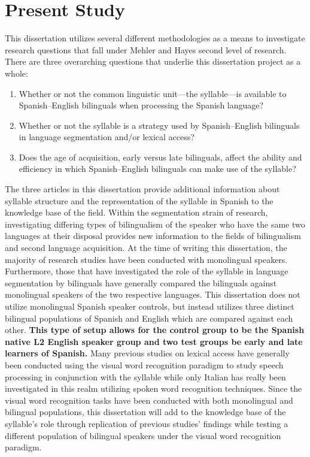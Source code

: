 
\section{Present Study}

This dissertation utilizes several different methodologies as a means to investigate research questions that fall under Mehler and Hayes \parencite*{Mehler1981-wp} second level of research. There are three overarching questions that underlie this dissertation project as a whole:
\begin{enumerate}
\item Whether or not the common linguistic unit—the syllable—is available to Spanish–English bilinguals when processing the Spanish language?
\item Whether or not the syllable is a strategy used by Spanish–English bilinguals in language segmentation and/or lexical access?
\item Does the age of acquisition, early versus late bilinguals, affect the ability and efficiency in which Spanish–English bilinguals can make use of the syllable?
\end{enumerate}

The three articles in this dissertation provide additional information about syllable structure and the representation of the syllable in Spanish to the knowledge base of the field. Within the segmentation strain of research, investigating differing types of bilingualism of the speaker who have the same two languages at their disposal provides new information to the fields of bilingualism and second language acquisition. At the time of writing this dissertation, the majority of research studies have been conducted with monolingual speakers. Furthermore, those that have investigated the role of the syllable in language segmentation by bilinguals have generally compared the bilinguals against monolingual speakers of the two respective languages. This dissertation does not utilize monolingual Spanish speaker controls, but instead utilizes three distinct bilingual populations of Spanish and English which are compared against each other. \textbf{This type of setup allows for the control group to be the Spanish native L2 English speaker group and two test groups be early and late learners of Spanish.} Many previous studies on lexical access have generally been conducted using the visual word recognition paradigm to study speech processing in conjunction with the syllable while only Italian has really been investigated in this realm utilizing spoken word recognition techniques. Since the visual word recognition tasks have been conducted with both monolingual and bilingual populations, this dissertation will add to the knowledge base of the syllable’s role through replication of previous studies' findings while testing a different population of bilingual speakers under the visual word recognition paradigm.

